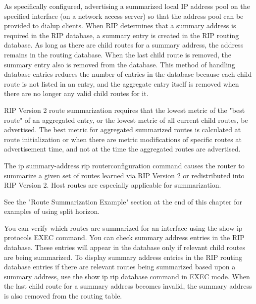 \documentclass[../EngineeringJournal_CDavis.tex]{subfiles}
\begin{document}
\hspace{0.2cm}
\begin{tcolorbox}[width=6.3in]
\scriptsize
As specifically configured, advertising a summarized local IP address pool on the specified interface (on a network access server) so that the address pool can be provided to dialup clients.
When RIP determines that a summary address is required in the RIP database, a summary entry is created in the RIP routing database. As long as there are child routes for a summary address, the address remains in the routing database. When the last child route is removed, the summary entry also is removed from the database. This method of handling database entries reduces the number of entries in the database because each child route is not listed in an entry, and the aggregate entry itself is removed when there are no longer any valid child routes for it.

RIP Version 2 route summarization requires that the lowest metric of the "best route" of an aggregated entry, or the lowest metric of all current child routes, be advertised. The best metric for aggregated summarized routes is calculated at route initialization or when there are metric modifications of specific routes at advertisement time, and not at the time the aggregated routes are advertised.

The ip summary-address rip routerconfiguration command causes the router to summarize a given set of routes learned via RIP Version 2 or redistributed into RIP Version 2. Host routes are especially applicable for summarization.
\end{tcolorbox}
\hspace{0.2cm}
\normalsize  

\hspace{0.2cm}
\begin{tcolorbox}[width=6.3in]
See the "Route Summarization Example" section at the end of this chapter for examples of using split horizon.
\end{tcolorbox}
\hspace{0.2cm}

\hspace{0.2cm}
\begin{tcolorbox}[width=6.3in]
\scriptsize
You can verify which routes are summarized for an interface using the show ip protocols EXEC command. You can check summary address entries in the RIP database. These entries will appear in the database only if relevant child routes are being summarized. To display summary address entries in the RIP routing database entries if there are relevant routes being summarized based upon a summary address, use the show ip rip database command in EXEC mode. When the last child route for a summary address becomes invalid, the summary address is also removed from the routing table.
\end{tcolorbox}
\hspace{0.2cm}
\normalsize  

\newpage

\end{document}
